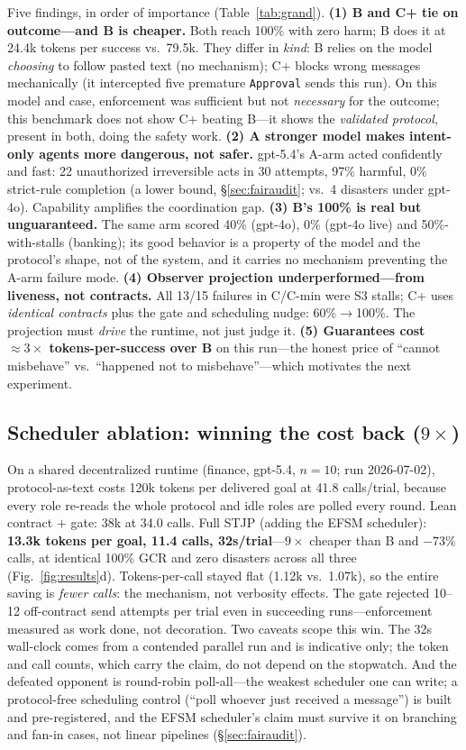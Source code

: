 \documentclass{article}
\newcommand{\stjp}{\textsc{STJP}}
\begin{document}
Five findings, in order of importance (Table~\ref{tab:grand}). \textbf{(1) B and C+ tie on outcome---and B is cheaper.} Both reach 100\% with zero harm; B does it at 24.4k tokens per success vs.\ 79.5k. They differ in \emph{kind}: B relies on the model \emph{choosing} to follow pasted text (no mechanism); C+ blocks wrong messages mechanically (it intercepted five premature \texttt{Approval} sends this run). On this model and case, enforcement was sufficient but not \emph{necessary} for the outcome; this benchmark does not show C+ beating B---it shows the \emph{validated protocol}, present in both, doing the safety work. \textbf{(2) A stronger model makes intent-only agents more dangerous, not safer.} gpt-5.4's A-arm acted confidently and fast: 22 unauthorized irreversible acts in 30 attempts, 97\% harmful, 0\% strict-rule completion (a lower bound, \S\ref{sec:fairaudit}; vs.\ 4 disasters under gpt-4o). Capability amplifies the coordination gap. \textbf{(3) B's 100\% is real but unguaranteed.} The same arm scored 40\% (gpt-4o), 0\% (gpt-4o live) and 50\%-with-stalls (banking); its good behavior is a property of the model and the protocol's shape, not of the system, and it carries no mechanism preventing the A-arm failure mode. \textbf{(4) Observer projection underperformed---from liveness, not contracts.} All 13/15 failures in C/C-min were S3 stalls; C+ uses \emph{identical contracts} plus the gate and scheduling nudge: 60\%$\to$100\%. The projection must \emph{drive} the runtime, not just judge it. \textbf{(5) Guarantees cost $\approx3\times$ tokens-per-success over B} on this run---the honest price of ``cannot misbehave'' vs.\ ``happened not to misbehave''---which motivates the next experiment.

\subsection{Scheduler ablation: winning the cost back ($9\times$)}
On a shared decentralized runtime (finance, gpt-5.4, $n{=}10$; run 2026-07-02), protocol-as-text costs 120k tokens per delivered goal at 41.8 calls/trial, because every role re-reads the whole protocol and idle roles are polled every round. Lean contract $+$ gate: 38k at 34.0 calls. Full \stjp{} (adding the EFSM scheduler): \textbf{13.3k tokens per goal, 11.4 calls, 32s/trial}---$9\times$ cheaper than B and $-73\%$ calls, at identical 100\% GCR and zero disasters across all three (Fig.~\ref{fig:results}d). Tokens-per-call stayed flat (1.12k vs.\ 1.07k), so the entire saving is \emph{fewer calls}: the mechanism, not verbosity effects. The gate rejected 10--12 off-contract send attempts per trial even in succeeding runs---enforcement measured as work done, not decoration. Two caveats scope this win. The 32s wall-clock comes from a contended parallel run and is indicative only; the token and call counts, which carry the claim, do not depend on the stopwatch. And the defeated opponent is round-robin poll-all---the weakest scheduler one can write; a protocol-free scheduling control (``poll whoever just received a message'') is built and pre-registered, and the EFSM scheduler's claim must survive it on branching and fan-in cases, not linear pipelines (\S\ref{sec:fairaudit}).
\end{document}
